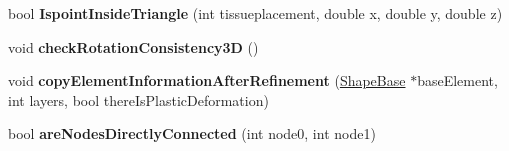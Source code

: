\begin{DoxyCompactItemize}
\item 
\hypertarget{classPrism_a26bb1eed04307a373ba87b48f1c1a3ca}{}bool {\bfseries Ispoint\+Inside\+Triangle} (int tissueplacement, double x, double y, double z)\label{classPrism_a26bb1eed04307a373ba87b48f1c1a3ca}

\item 
\hypertarget{classPrism_a85f9b472a3310e76ab0c76bd1fb7dd30}{}void {\bfseries check\+Rotation\+Consistency3\+D} ()\label{classPrism_a85f9b472a3310e76ab0c76bd1fb7dd30}

\item 
\hypertarget{classPrism_aecf1c8d20246749b04dfbb3b55e981c0}{}void {\bfseries copy\+Element\+Information\+After\+Refinement} (\hyperlink{classShapeBase}{Shape\+Base} $\ast$base\+Element, int layers, bool there\+Is\+Plastic\+Deformation)\label{classPrism_aecf1c8d20246749b04dfbb3b55e981c0}

\item 
\hypertarget{classPrism_ae33eafcdbe69936cca29d7f23649c8cc}{}bool {\bfseries are\+Nodes\+Directly\+Connected} (int node0, int node1)\label{classPrism_ae33eafcdbe69936cca29d7f23649c8cc}

\end{DoxyCompactItemize}
